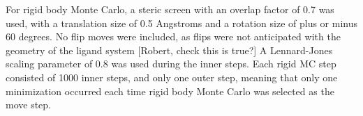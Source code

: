 For rigid body Monte Carlo, a steric screen with an overlap factor of 0.7 was used, with a translation size of 0.5 Angstroms and a rotation size of plus or minus 60 degrees.
No flip moves were included, as flips were not anticipated with the geometry of the ligand system [Robert, check this is true?] A Lennard-Jones scaling parameter of 0.8 was used during the inner steps.
Each rigid MC step consisted of 1000 inner steps, and only one outer step, meaning that only one minimization occurred each time rigid body Monte Carlo was selected as the move step.

